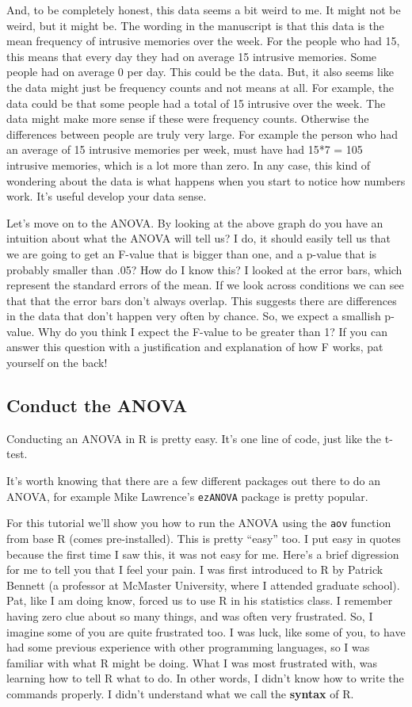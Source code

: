 \documentclass[]{book}
\theoremstyle{definition}
\theoremstyle{definition}
\theoremstyle{definition}
\theoremstyle{remark}
\begin{document}
And, to be completely honest, this data seems a bit weird to me. It
might not be weird, but it might be. The wording in the manuscript is
that this data is the mean frequency of intrusive memories over the
week. For the people who had 15, this means that every day they had on
average 15 intrusive memories. Some people had on average 0 per day.
This could be the data. But, it also seems like the data might just be
frequency counts and not means at all. For example, the data could be
that some people had a total of 15 intrusive over the week. The data
might make more sense if these were frequency counts. Otherwise the
differences between people are truly very large. For example the person
who had an average of 15 intrusive memories per week, must have had 15*7
= 105 intrusive memories, which is a lot more than zero. In any case,
this kind of wondering about the data is what happens when you start to
notice how numbers work. It's useful develop your data sense.

Let's move on to the ANOVA. By looking at the above graph do you have an
intuition about what the ANOVA will tell us? I do, it should easily tell
us that we are going to get an F-value that is bigger than one, and a
p-value that is probably smaller than .05? How do I know this? I looked
at the error bars, which represent the standard errors of the mean. If
we look across conditions we can see that that the error bars don't
always overlap. This suggests there are differences in the data that
don't happen very often by chance. So, we expect a smallish p-value. Why
do you think I expect the F-value to be greater than 1? If you can
answer this question with a justification and explanation of how F
works, pat yourself on the back!

\subsection{Conduct the ANOVA}\label{conduct-the-anova}

Conducting an ANOVA in R is pretty easy. It's one line of code, just
like the t-test.

It's worth knowing that there are a few different packages out there to
do an ANOVA, for example Mike Lawrence's \texttt{ezANOVA} package is
pretty popular.

For this tutorial we'll show you how to run the ANOVA using the
\texttt{aov} function from base R (comes pre-installed). This is pretty
``easy'' too. I put easy in quotes because the first time I saw this, it
was not easy for me. Here's a brief digression for me to tell you that I
feel your pain. I was first introduced to R by Patrick Bennett (a
professor at McMaster University, where I attended graduate school).
Pat, like I am doing know, forced us to use R in his statistics class. I
remember having zero clue about so many things, and was often very
frustrated. So, I imagine some of you are quite frustrated too. I was
luck, like some of you, to have had some previous experience with other
programming languages, so I was familiar with what R might be doing.
What I was most frustrated with, was learning how to tell R what to do.
In other words, I didn't know how to write the commands properly. I
didn't understand what we call the \textbf{syntax} of R.
\end{document}
